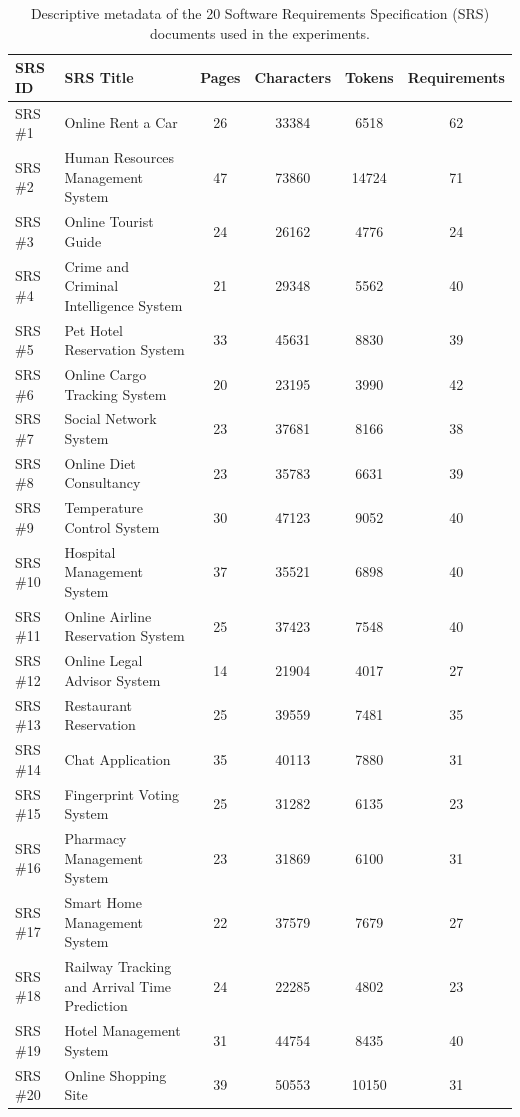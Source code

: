 \begin{table}[pos=h]
\centering
\caption{Descriptive metadata of the 20 Software Requirements Specification (SRS) documents used in the experiments.}
\label{tab:srs_dataset}
\begin{tabular}{llcccc}
\toprule
\textbf{SRS ID} & \textbf{SRS Title} & \textbf{Pages} & \textbf{Characters} & \textbf{Tokens} & \textbf{Requirements} \\
\midrule
SRS \#1  & Online Rent a Car                             & 26 & 33384 & 6518  & 62 \\
SRS \#2  & Human Resources Management System             & 47 & 73860 & 14724 & 71 \\
SRS \#3  & Online Tourist Guide                          & 24 & 26162 & 4776  & 24 \\
SRS \#4  & Crime and Criminal Intelligence System        & 21 & 29348 & 5562  & 40 \\
SRS \#5  & Pet Hotel Reservation System                  & 33 & 45631 & 8830  & 39 \\
SRS \#6  & Online Cargo Tracking System                  & 20 & 23195 & 3990  & 42 \\
SRS \#7  & Social Network System                         & 23 & 37681 & 8166  & 38 \\
SRS \#8  & Online Diet Consultancy                       & 23 & 35783 & 6631  & 39 \\
SRS \#9  & Temperature Control System                    & 30 & 47123 & 9052  & 40 \\
SRS \#10 & Hospital Management System                    & 37 & 35521 & 6898  & 40 \\
SRS \#11 & Online Airline Reservation System             & 25 & 37423 & 7548  & 40 \\
SRS \#12 & Online Legal Advisor System                   & 14 & 21904 & 4017  & 27 \\
SRS \#13 & Restaurant Reservation                        & 25 & 39559 & 7481  & 35 \\
SRS \#14 & Chat Application                              & 35 & 40113 & 7880  & 31 \\
SRS \#15 & Fingerprint Voting System                     & 25 & 31282 & 6135  & 23 \\
SRS \#16 & Pharmacy Management System                    & 23 & 31869 & 6100  & 31 \\
SRS \#17 & Smart Home Management System                  & 22 & 37579 & 7679  & 27 \\
SRS \#18 & Railway Tracking and Arrival Time Prediction  & 24 & 22285 & 4802  & 23 \\
SRS \#19 & Hotel Management System                       & 31 & 44754 & 8435  & 40 \\
SRS \#20 & Online Shopping Site                          & 39 & 50553 & 10150 & 31 \\
\bottomrule
\end{tabular}
\end{table}

